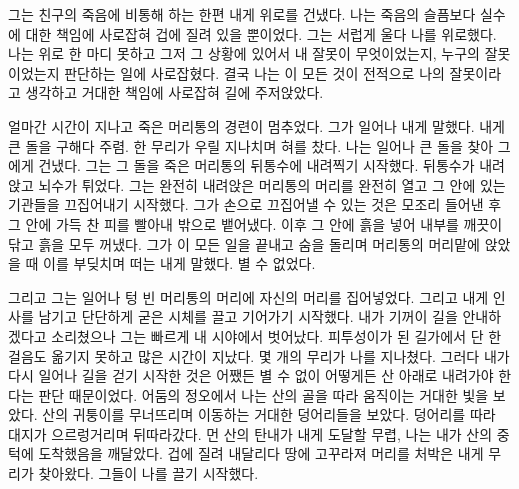 그는 친구의 죽음에 비통해 하는 한편 내게 위로를 건냈다. 나는 죽음의 슬픔보다 실수에 대한 책임에 사로잡혀 겁에 질려 있을 뿐이었다. 그는 서럽게 울다 나를 위로했다. 나는 위로 한 마디 못하고 그저 그 상황에 있어서 내 잘못이 무엇이었는지, 누구의 잘못이었는지 판단하는 일에 사로잡혔다. 결국 나는 이 모든 것이 전적으로 나의 잘못이라고 생각하고 거대한 책임에 사로잡혀 길에 주저앉았다.



얼마간 시간이 지나고 죽은 머리통의 경련이 멈추었다. 그가 일어나 내게 말했다. 내게 큰 돌을 구해다 주렴. 한 무리가 우릴 지나치며 혀를 찼다. 나는 일어나 큰 돌을 찾아 그에게 건냈다. 그는 그 돌을 죽은 머리통의 뒤통수에 내려찍기 시작했다. 뒤통수가 내려앉고 뇌수가 튀었다. 그는 완전히 내려앉은 머리통의 머리를 완전히 열고 그 안에 있는 기관들을 끄집어내기 시작했다. 그가 손으로 끄집어낼 수 있는 것은 모조리 들어낸 후 그 안에 가득 찬 피를 빨아내 밖으로 뱉어냈다. 이후 그 안에 흙을 넣어 내부를 깨끗이 닦고 흙을 모두 꺼냈다. 그가 이 모든 일을 끝내고 숨을 돌리며 머리통의 머리맡에 앉았을 때 이를 부딪치며 떠는 내게 말했다. 별 수 없었다.



그리고 그는 일어나 텅 빈 머리통의 머리에 자신의 머리를 집어넣었다. 그리고 내게 인사를 남기고 단단하게 굳은 시체를 끌고 기어가기 시작했다. 내가 기꺼이 길을 안내하겠다고 소리쳤으나 그는 빠르게 내 시야에서 벗어났다. 피투성이가 된 길가에서 단 한 걸음도 옮기지 못하고 많은 시간이 지났다. 몇 개의 무리가 나를 지나쳤다. 그러다 내가 다시 일어나 길을 걷기 시작한 것은 어쨌든 별 수 없이 어떻게든 산 아래로 내려가야 한다는 판단 때문이었다. 어둠의 정오에서 나는 산의 골을 따라 움직이는 거대한 빛을 보았다. 산의 귀퉁이를 무너뜨리며 이동하는 거대한 덩어리들을 보았다. 덩어리를 따라 대지가 으르렁거리며 뒤따라갔다. 먼 산의 탄내가 내게 도달할 무렵, 나는 내가 산의 중턱에 도착했음을 깨달았다. 겁에 질려 내달리다 땅에 고꾸라져 머리를 처박은 내게 무리가 찾아왔다. 그들이 나를 끌기 시작했다.

